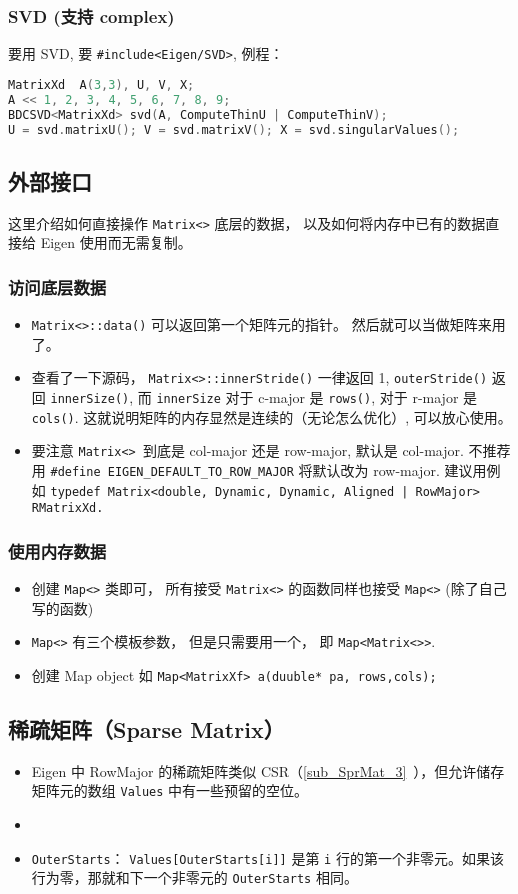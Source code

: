 \subsubsection{SVD (支持 complex)}
要用 SVD, 要 \verb|#include<Eigen/SVD>|, 例程：
\begin{lstlisting}[language=cpp]
MatrixXd  A(3,3), U, V, X;
A << 1, 2, 3, 4, 5, 6, 7, 8, 9;
BDCSVD<MatrixXd> svd(A, ComputeThinU | ComputeThinV);
U = svd.matrixU(); V = svd.matrixV(); X = svd.singularValues();
\end{lstlisting}

\subsection{外部接口}
这里介绍如何直接操作 \verb|Matrix<>| 底层的数据， 以及如何将内存中已有的数据直接给 Eigen 使用而无需复制。

\subsubsection{访问底层数据}
\begin{itemize}
\item \verb|Matrix<>::data()| 可以返回第一个矩阵元的指针。 然后就可以当做矩阵来用了。
\item 查看了一下源码， \verb|Matrix<>::innerStride()| 一律返回 1, \verb|outerStride()| 返回 \verb|innerSize()|, 而 \verb|innerSize| 对于 c-major 是 \verb|rows()|, 对于 r-major 是 \verb|cols()|. 这就说明矩阵的内存显然是连续的（无论怎么优化）, 可以放心使用。
\item 要注意 \verb|Matrix<> |到底是 col-major 还是 row-major, 默认是 col-major. 不推荐用 \verb|#define EIGEN_DEFAULT_TO_ROW_MAJOR| 将默认改为 row-major. 建议用例如 \verb`typedef Matrix<double, Dynamic, Dynamic, Aligned | RowMajor> RMatrixXd.`
\end{itemize}

\subsubsection{使用内存数据}
\begin{itemize}
\item 创建 \verb|Map<>| 类即可， 所有接受 \verb|Matrix<>| 的函数同样也接受 \verb|Map<>| (除了自己写的函数)
\item \verb|Map<>| 有三个模板参数， 但是只需要用一个， 即 \verb|Map<Matrix<>>|.
\item 创建 Map object 如 \verb|Map<MatrixXf> a(duuble* pa, rows,cols);|
\end{itemize}

\subsection{稀疏矩阵（Sparse Matrix）}
\begin{itemize}
\item Eigen 中 RowMajor 的稀疏矩阵类似 CSR（\autoref{sub_SprMat_3}~），但允许储存矩阵元的数组 \verb|Values| 中有一些预留的空位。
\item 
\item \verb|OuterStarts|： \verb|Values[OuterStarts[i]]| 是第 \verb|i| 行的第一个非零元。如果该行为零，那就和下一个非零元的 \verb|OuterStarts| 相同。
\end{itemize}
